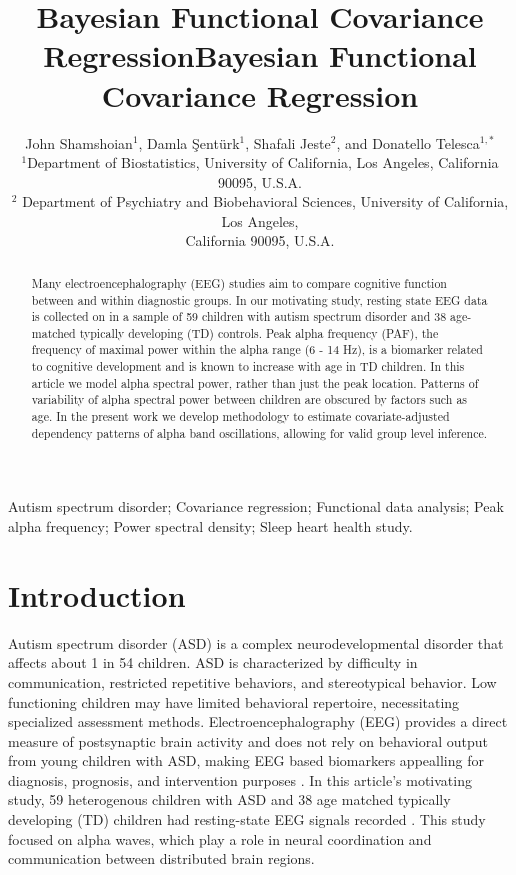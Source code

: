 \documentclass[useAMS,referee,usenatbib]{biom}
\title[This is an Example of Recto Running Head]{Bayesian Functional Covariance Regression}
\author{John Shamshoian$^{1}$\email{donatello.telesca@ucla.edu}, Damla {\c S}ent{\"u}rk$^{1}$, Shafali Jeste$^{2}$, and Donatello Telesca$^{1,*}$ \\$^{1}$Department of Biostatistics, University of California, Los Angeles, California 90095, U.S.A.\\$^{2}$ Department of Psychiatry and Biobehavioral Sciences, University of California, Los Angeles,\\ California 90095, U.S.A.}
\title[Bayesian Functional Covariance Regression]{Bayesian Functional Covariance Regression}
\begin{document}
\label{firstpage}


\begin{abstract}
	Many electroencephalography (EEG) studies aim to compare cognitive function between and within diagnostic groups. In our motivating study, resting state EEG data is collected on in a sample of 59 children with autism spectrum disorder and 38 age-matched typically developing (TD) controls. Peak alpha frequency (PAF), the frequency of maximal power within the alpha range (6 - 14 Hz), is a biomarker related to cognitive development and is known to increase with age in TD children. In this article we model alpha spectral power, rather than just the peak location. Patterns of variability of alpha spectral power between children are obscured by factors such as age. In the present work we develop methodology to estimate covariate-adjusted dependency patterns of alpha band oscillations, allowing for valid group level inference.  
\end{abstract}

%

\begin{keywords}
	Autism spectrum disorder; Covariance regression; Functional data analysis; Peak alpha frequency; Power spectral density; Sleep heart health study.
\end{keywords}


\maketitle


\section{Introduction}
\label{s:intro}
Autism spectrum disorder (ASD) is a complex neurodevelopmental disorder that affects about 1 in 54 children. ASD is characterized by difficulty in communication, restricted repetitive behaviors, and stereotypical behavior. Low functioning children may have limited behavioral repertoire, necessitating specialized assessment methods. Electroencephalography (EEG) provides a direct measure of postsynaptic brain activity and does not rely on behavioral output from young children with ASD, making EEG based biomarkers appealling for diagnosis, prognosis, and intervention purposes \citep*{Jeste2015}. In this article's motivating study, 59 heterogenous children with ASD and 38 age matched typically developing (TD) children had resting-state EEG signals recorded \citep*{Dickinson2017}. This study focused on alpha waves, which play a role in neural coordination and communication between distributed brain regions.
\end{document}
